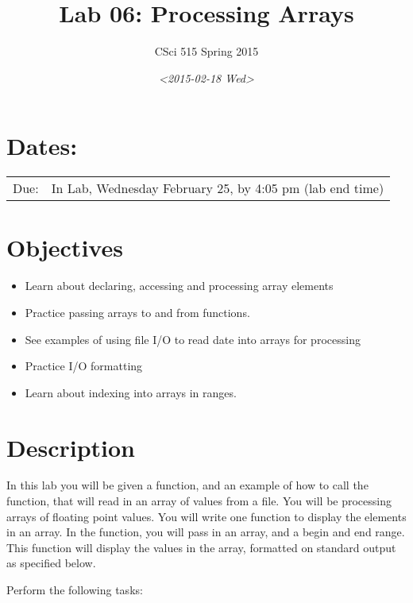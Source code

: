 \documentclass[11pt]{article}
\author{CSci 515 Spring 2015}
\date{\textit{<2015-02-18 Wed>}}
\title{Lab 06: Processing Arrays}
\begin{document}
\maketitle

\section*{Dates:}
\label{sec-1}
\begin{center}
\begin{tabular}{ll}
Due: & In Lab, Wednesday February 25, by 4:05 pm (lab end time)\\
\end{tabular}
\end{center}
\section*{Objectives}
\label{sec-2}
\begin{itemize}
\item Learn about declaring, accessing and processing array elements
\item Practice passing arrays to and from functions.
\item See examples of using file I/O to read date into arrays for processing
\item Practice I/O formatting
\item Learn about indexing into arrays in ranges.
\end{itemize}
\section*{Description}
\label{sec-3}
In this lab you will be given a function, and an example of how to
call the function, that will read in an array of values from a
file. You will be processing arrays of floating point values.  You
will write one function to display the elements in an array.  In the
function, you will pass in an array, and a begin and end range.  This
function will display the values in the array, formatted on standard
output as specified below.

Perform the following tasks:
\end{document}
